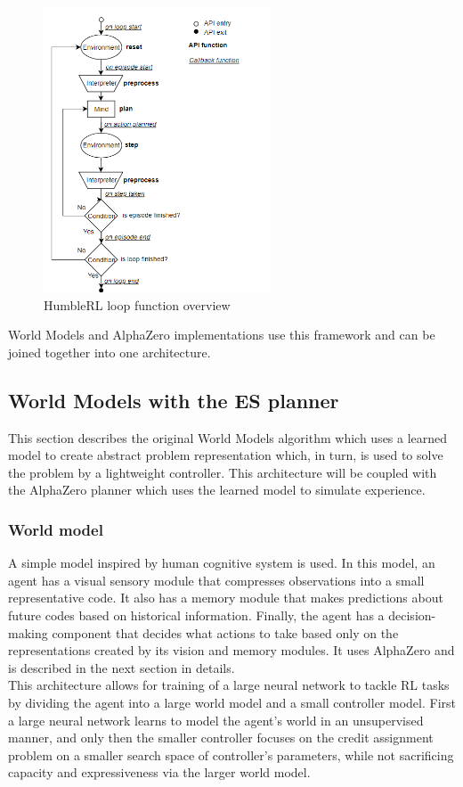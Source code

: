 \begin{figure}[H]
\includegraphics[width=0.6\textwidth,keepaspectratio]{figures/HumbleRL/loop.png}
\caption{HumbleRL loop function overview}
\label{Fig.HRL_loop}
\end{figure}

World Models and AlphaZero implementations use this framework and can be joined together into one architecture.

\subsection{World Models with the ES planner}

This section describes the original World Models \cite{Algo.WorldModels} algorithm which uses a learned model to create abstract problem representation which, in turn, is used to solve the problem by a lightweight controller. This architecture will be coupled with the AlphaZero planner which uses the learned model to simulate experience.

\subsubsection{World model}

A simple model inspired by human cognitive system is used. In this model, an agent has a visual sensory module that compresses observations into a small representative code. It also has a memory module that makes predictions about future codes based on historical information. Finally, the agent has a decision-making component that decides what actions to take based only on the representations created by its vision and memory modules. It uses AlphaZero and is described in the next section in details. \\
This architecture allows for training of a large neural network to tackle RL tasks by dividing the agent into a large world model and a small controller model. First a large neural network learns to model the agent’s world in an unsupervised manner, and only then the smaller controller focuses on the credit assignment problem on a smaller search space of controller's parameters, while not sacrificing capacity and expressiveness via the larger world model.

